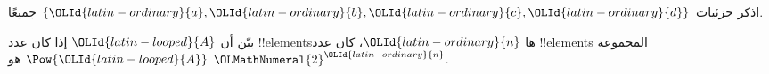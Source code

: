 \documentclass[../../../include/open-logic-section]{subfiles}
\begin{document}
\begin{prob}
اذكر جزئيات $\{{\OLId{latin-ordinary}{a}}, {\OLId{latin-ordinary}{b}}, {\OLId{latin-ordinary}{c}}, {\OLId{latin-ordinary}{d}}\}$ جميعًا.
\end{prob}

\begin{prob}
بيّن أن ${\OLId{latin-looped}{A}}$ إذا كان عدد !!{element}sها ${\OLId{latin-ordinary}{n}}$، كان عدد !!{element}s
المجموعة $\Pow{{\OLId{latin-looped}{A}}}$ هو ${\OLMathNumeral{2}}^{\OLId{latin-ordinary}{n}}$.
\end{prob}
\end{document}
